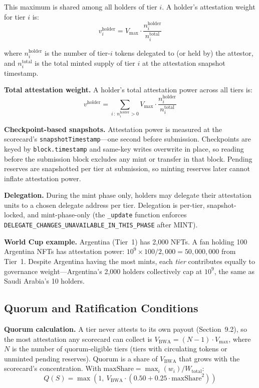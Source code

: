 \documentclass[11pt,a4paper]{article}
\begin{document}
This maximum is shared among all holders of tier $i$. A holder's attestation weight for tier $i$ is:
\begin{equation}
\boxed{v_i^{\text{holder}} = V_{\max} \cdot \frac{n_i^{\text{holder}}}{n_i^{\text{total}}}}
\end{equation}

where $n_i^{\text{holder}}$ is the number of tier-$i$ tokens delegated to (or held by) the attestor, and $n_i^{\text{total}}$ is the total minted supply of tier $i$ at the attestation snapshot timestamp.

\textbf{Total attestation weight.} A holder's total attestation power across all tiers is:
\begin{equation}
v^{\text{holder}} = \sum_{i \,:\, n_i^{\text{holder}} > 0} V_{\max} \cdot \frac{n_i^{\text{holder}}}{n_i^{\text{total}}}
\end{equation}

\textbf{Checkpoint-based snapshots.} Attestation power is measured at the scorecard's \texttt{snapshotTimestamp}---one second before submission. Checkpoints are keyed by \texttt{block.timestamp} and same-key writes overwrite in place, so reading before the submission block excludes any mint or transfer in that block. Pending reserves are snapshotted per tier at submission, so minting reserves later cannot inflate attestation power.

\textbf{Delegation.} During the mint phase only, holders may delegate their attestation units to a chosen delegate address per tier. Delegation is per-tier, snapshot-locked, and mint-phase-only (the \texttt{\_update} function enforces \texttt{DELEGATE\_CHANGES\_UNAVAILABLE\_IN\_THIS\_PHASE} after MINT).

\textbf{World Cup example.} Argentina (Tier~1) has 2,000 NFTs. A fan holding 100 Argentina NFTs has attestation power: $10^9 \times 100/2{,}000 = 50{,}000{,}000$ from Tier~1. Despite Argentina having the most mints, each \emph{tier} contributes equally to governance weight---Argentina's 2,000 holders collectively cap at $10^9$, the same as Saudi Arabia's 10 holders.

\subsection{Quorum and Ratification Conditions}

\textbf{Quorum calculation.} A tier never attests to its own payout (Section~9.2), so the most attestation any scorecard can collect is $V_{\text{BWA}} = (N - 1) \cdot V_{\max}$, where $N$ is the number of quorum-eligible tiers (tiers with circulating tokens or unminted pending reserves). Quorum is a share of $V_{\text{BWA}}$ that grows with the scorecard's concentration. With $\text{maxShare} = \max_i(w_i) / W_{\text{total}}$:
\begin{equation}
\boxed{Q(S) = \max\left(1,\ V_{\text{BWA}} \cdot \left(0.50 + 0.25 \cdot \text{maxShare}^2\right)\right)}
\end{equation}
\end{document}
